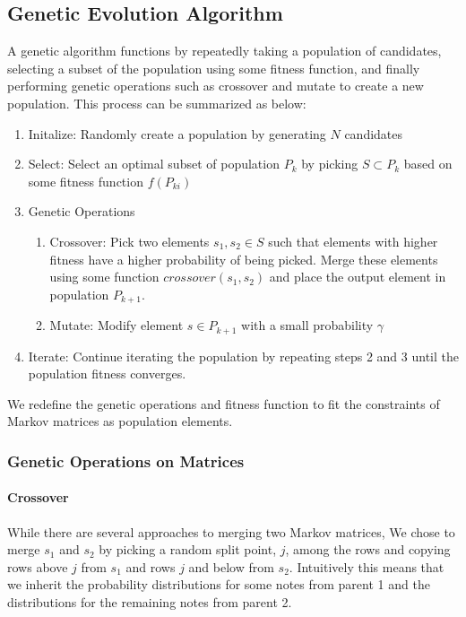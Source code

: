 \documentclass{article}
\begin{document}
\subsection{Genetic Evolution Algorithm}

A genetic algorithm functions by repeatedly taking a population of candidates, selecting a subset of the population using some fitness function, and finally performing genetic operations such as crossover and mutate to create a new population. This process can be summarized as below:

\begin{enumerate}
\item Initalize: Randomly create a population by generating $N$ candidates
\item Select: Select an optimal subset of population $P_k$ by picking $S \subset P_k$ based on some fitness function $f(P_{ki})$
\item Genetic Operations
  \begin{enumerate}
  \item Crossover: Pick two elements $s_1, s_2 \in S$ such that elements with higher fitness have a higher probability of being picked. Merge these elements using some function $crossover(s_1, s_2)$ and place the output element in population $P_{k + 1}$.
  \item Mutate: Modify element $s \in P_{k + 1}$ with a small probability $\gamma$
  \end{enumerate}
\item Iterate: Continue iterating the population by repeating steps 2 and 3 until the population fitness converges.
\end{enumerate}

We redefine the genetic operations and fitness function to fit the constraints of Markov matrices as population elements.

\subsubsection{Genetic Operations on Matrices}

\paragraph{Crossover} While there are several approaches to merging two Markov matrices, We chose to merge $s_1$ and $s_2$ by picking a random split point, $j$, among the rows and copying rows above $j$ from $s_1$ and rows $j$ and below from $s_2$. Intuitively this means that we inherit the probability distributions for some notes from parent 1 and the distributions for the remaining notes from parent 2.
\end{document}
